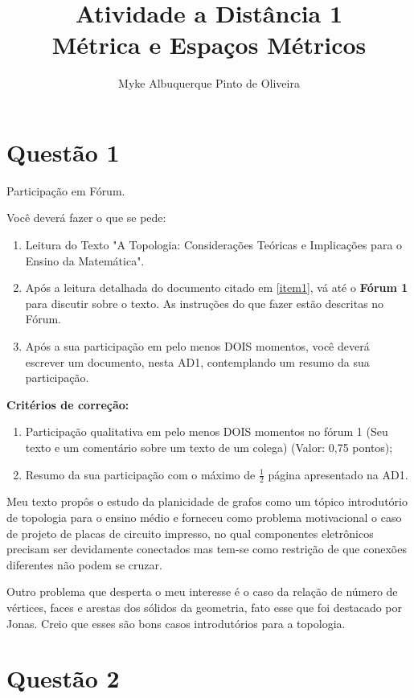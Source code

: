 \documentclass[10pt,a4paper]{article}
\author{Myke Albuquerque Pinto de Oliveira}
\title{\Huge Atividade a Distância 1 \\ 
	Métrica e Espaços Métricos}
\begin{document}
	
	\maketitle
	\newpage
	
	\section*{Questão 1}
	
	Participação em Fórum.
	
	Você deverá fazer o que se pede:
	
	\begin{enumerate}
		\item \label{item1}Leitura do Texto "A Topologia: Considerações Teóricas e Implicações para o Ensino da Matemática".
		\item Após a leitura detalhada do documento citado em \ref{item1}, vá até o \textbf{Fórum 1} para discutir sobre o texto. As instruções do que fazer estão descritas no Fórum.
		\item Após a sua participação em pelo menos DOIS momentos, você deverá escrever um documento, nesta AD1, contemplando um resumo da sua participação.
	\end{enumerate}

	\textbf{Critérios de correção:}
	
	\begin{enumerate}[a]
		\item Participação qualitativa em pelo menos DOIS momentos no fórum 1 (Seu texto e um comentário sobre um texto de um colega) (Valor: 0,75 pontos);
		\item Resumo da sua participação com o máximo de $ \frac{1}{2} $ página apresentado na AD1.
	\end{enumerate}

	Meu texto propôs o estudo da planicidade de grafos como um tópico introdutório de topologia para o ensino médio e forneceu como problema motivacional o caso de projeto de placas de circuito impresso, no qual componentes eletrônicos precisam ser devidamente conectados mas tem-se como restrição de que conexões diferentes não podem se cruzar.
	
	Outro problema que desperta o meu interesse é o caso da relação de número de vértices, faces e arestas dos sólidos da geometria, fato esse que foi destacado por Jonas. Creio que esses são bons casos introdutórios para a topologia.
	
	\section*{Questão 2}
	
\end{document}
